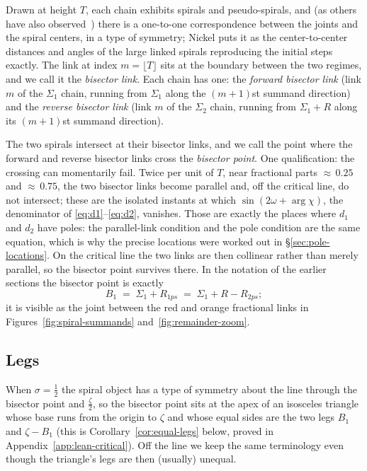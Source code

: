 \documentclass[11pt]{article}
\theoremstyle{definition}
\begin{document}
Drawn at height $T$, each chain exhibits spirals and pseudo-spirals, and (as
others have also observed~\cite{Erickson2005,Lander2018,Nickel2013,Kapitonets2019}) there is a one-to-one correspondence between the
joints and the spiral centers, in a type of symmetry; Nickel puts it as the
center-to-center distances and angles of the large linked spirals reproducing
the initial steps exactly. The link
at index $m=\lfloor T\rfloor$ sits at the boundary between the two
regimes, and we call it the \emph{bisector link}. Each chain has one: the \emph{forward bisector link} (link $m$ of the
$\Sigma_1$ chain, running from $\Sigma_1$ along the $(m+1)$st summand
direction) and the \emph{reverse bisector link} (link $m$ of the $\Sigma_2$
chain, running from $\Sigma_1+R$ along its $(m+1)$st summand direction).

The two spirals intersect at their bisector links, and we call the point where
the forward and reverse bisector links cross the \emph{bisector point}. One
qualification: the crossing can momentarily fail. Twice per unit of $T$, near
fractional parts ${\approx}\,0.25$ and ${\approx}\,0.75$, the two bisector
links become parallel and, off the critical line, do not intersect; these are
the isolated instants at which $\sin(2\omega+\arg\chi)$, the denominator of
\eqref{eq:d1}--\eqref{eq:d2}, vanishes. Those are exactly the places where
$d_1$ and $d_2$ have poles: the parallel-link condition and the pole
condition are the same equation, which is why the precise locations were
worked out in \S\ref{sec:pole-locations}. On the critical line the two links are then collinear rather than
merely parallel, so the bisector point survives there.
In the notation of the earlier sections the bisector point is exactly
\begin{equation}\label{eq:bisector-point}
B_1 \;=\; \Sigma_1 + R_{1ps} \;=\; \Sigma_1 + R - R_{2ps};
\end{equation}
it is visible as the joint between the red and orange fractional
links in Figures~\ref{fig:spiral-summands} and~\ref{fig:remainder-zoom}.

\subsection{Legs}\label{sec:legs}

When $\sigma=\tfrac12$ the spiral object
has a type of symmetry about the line through the bisector point and
$\tfrac{\zeta}{2}$, so the bisector point sits at the apex of an isosceles
triangle whose base runs from the origin to $\zeta$ and whose equal sides are
the two legs $B_1$ and $\zeta-B_1$ (this is Corollary~\ref{cor:equal-legs}
below, proved in Appendix~\ref{app:lean-critical}). Off the line we keep the same
terminology even though the triangle's legs are then (usually) unequal.
\end{document}

